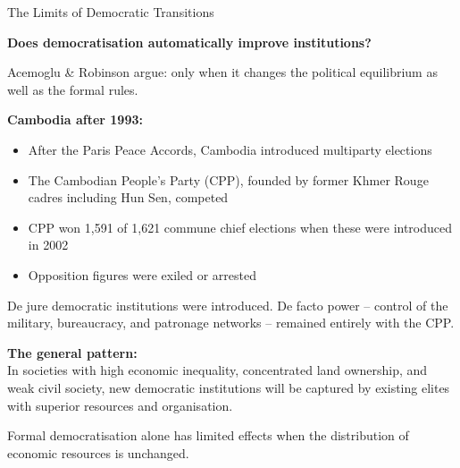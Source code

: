 \documentclass[10pt]{beamer}
\begin{document}
\begin{frame}[allowframebreaks]{The Limits of Democratic Transitions}

\textbf{Does democratisation automatically improve institutions?}


Acemoglu \& Robinson argue: only when it changes the political equilibrium as well as the formal rules.


\textbf{Cambodia after 1993:}
\begin{itemize}
\item After the Paris Peace Accords, Cambodia introduced multiparty elections
\item The Cambodian People's Party (CPP), founded by former Khmer Rouge cadres including Hun Sen, competed
\item CPP won 1,591 of 1,621 commune chief elections when these were introduced in 2002
\item Opposition figures were exiled or arrested
\end{itemize}

De jure democratic institutions were introduced. De facto power -- control of the military, bureaucracy, and patronage networks -- remained entirely with the CPP.


\textbf{The general pattern:}\\
In societies with high economic inequality, concentrated land ownership, and weak civil society, new democratic institutions will be captured by existing elites with superior resources and organisation.


\alert{Formal democratisation alone has limited effects when the distribution of economic resources is unchanged.}
\end{frame}
\end{document}
